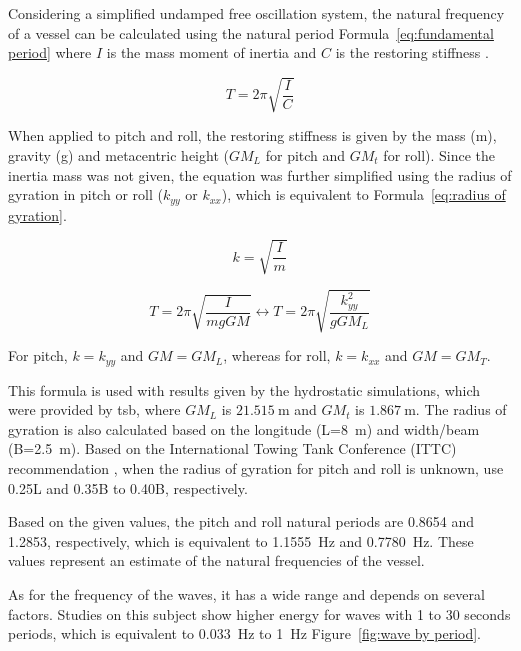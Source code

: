 Considering a simplified undamped free oscillation system, the natural frequency of a vessel can be calculated using the natural period Formula~\ref{eq:fundamental period} where $I$ is the mass moment of inertia and $C$ is the restoring stiffness \cite{rao2011mechanical}.

\begin{equation}
    T = 2\pi \sqrt{\frac{I}{C}}
    \label{eq:fundamental period}
\end{equation}

When applied to pitch and roll, the restoring stiffness is given by the mass (m), gravity (g) and metacentric height ($GM_L$ for pitch and $GM_t$ for roll). Since the inertia mass was not given, the equation was further simplified using the radius of gyration in pitch or roll ($k_{yy}$ or $k_{xx}$), which is equivalent to Formula~\ref{eq:radius of gyration}.

\begin{equation}
    k = \sqrt{\frac{I}{m}}
    \label{eq:radius of gyration}
\end{equation}

\begin{equation}
    T = 2\pi \sqrt{\frac{I}{mgGM}} \leftrightarrow T = 2\pi \sqrt{\frac{k_{yy}^2}{gGM_L}}
    \label{eq: natural period}
\end{equation}

For pitch, $k=k_{yy}$ and $GM=GM_L$, whereas for roll, $k=k_{xx}$ and $GM=GM_T$.

This formula is used with results given by the hydrostatic simulations, which were provided by \ac{tsb}, where $GM_L$ is $21.515~\mathrm{m}$ and $GM_t$ is $1.867~\mathrm{m}$. The radius of gyration is also calculated based on the longitude (L=8~m) and width/beam (B=2.5~m). Based on the International Towing Tank Conference (ITTC) recommendation \cite{ittc_seakeeping_2024}, when the radius of gyration for pitch and roll is unknown, use 0.25L and 0.35B to 0.40B, respectively.

Based on the given values, the pitch and roll natural periods are 0.8654 and 1.2853, respectively, which is equivalent to 1.1555~Hz and 0.7780~Hz. These values represent an estimate of the natural frequencies of the vessel.

As for the frequency of the waves, it has a wide range and depends on several factors. Studies on this subject show higher energy for waves with 1 to 30 seconds periods, which is equivalent to 0.033~Hz to 1~Hz Figure~\ref{fig:wave by period}.

